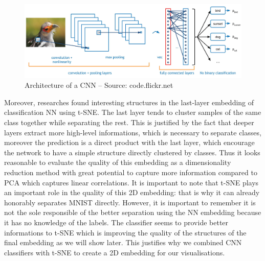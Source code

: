 \documentclass[a4paper,12pt]{report}
\begin{document}
\begin{figure}[h]
    \begin{center}
        \includegraphics[width=\textwidth]{thesis_figures/conv-net2.jpg}
    \end{center}
    \caption{Architecture of a CNN -- Source: code.flickr.net}
    \label{fig:convnet}
\end{figure}

Moreover, researches found interesting structures in the last-layer embedding of classification NN using t-SNE.
The last layer tends to cluster samples of the same class together while separating the rest\cite{donahue2013decaf}\cite{yu2014visualizing}.
This is justified by the fact that deeper layers extract more high-level informations, which is necessary to separate classes, moreover the prediction is a direct product with the last layer, which encourage the network to have a simple structure directly clustered by classes.
Thus it looks reasonable to evaluate the quality of this embedding as a dimensionality reduction method with great potential to capture more information compared to PCA which captures linear correlations.
It is important to note that t-SNE plays an important role in the quality of this 2D embedding: that is why it can already honorably separates MNIST directly.
However, it is important to remember it is not the sole responsible of the better separation using the NN embedding because it has no knowledge of the labels.
The classifier seems to provide better informations to t-SNE which is improving the quality of the structures of the final embedding as we will show later.
This justifies why we combined CNN classifiers with t-SNE to create a 2D embedding for our visualisations.


\end{document}
